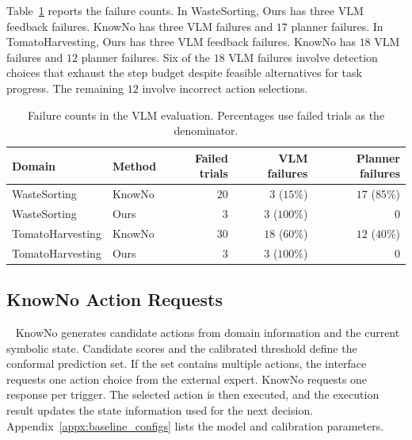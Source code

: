 Table~\ref{tab:app_vlm_failures} reports the failure counts. In WasteSorting, Ours has three VLM feedback failures. KnowNo has three VLM failures and $17$ planner failures. In TomatoHarvesting, Ours has three VLM feedback failures. KnowNo has $18$ VLM failures and $12$ planner failures. Six of the $18$ VLM failures involve detection choices that exhaust the step budget despite feasible alternatives for task progress. The remaining $12$ involve incorrect action selections.

\begin{table}[!htbp]
\centering
\caption{Failure counts in the VLM evaluation. Percentages use failed trials as the denominator.}
\label{tab:app_vlm_failures}
\small
\begin{tabular}{llrrr}
\toprule
Domain & Method & Failed trials & VLM failures & Planner failures \\
\midrule
WasteSorting & KnowNo & $20$ & $3$ ($15\%$) & $17$ ($85\%$) \\
WasteSorting & Ours & $3$ & $3$ ($100\%$) & $0$ \\
TomatoHarvesting & KnowNo & $30$ & $18$ ($60\%$) & $12$ ($40\%$) \\
TomatoHarvesting & Ours & $3$ & $3$ ($100\%$) & $0$ \\
\bottomrule
\end{tabular}
\end{table}

\subsection{KnowNo Action Requests}~\label{appx:knowno_impl}
KnowNo generates candidate actions from domain information and the current symbolic state. Candidate scores and the calibrated threshold define the conformal prediction set. If the set contains multiple actions, the interface requests one action choice from the external expert. KnowNo requests one response per trigger. The selected action is then executed, and the execution result updates the state information used for the next decision. Appendix~\ref{appx:baseline_configs} lists the model and calibration parameters.
